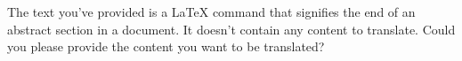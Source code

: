 


The text you've provided is a LaTeX command that signifies the end of an abstract section in a document. It doesn't contain any content to translate. Could you please provide the content you want to be translated?

